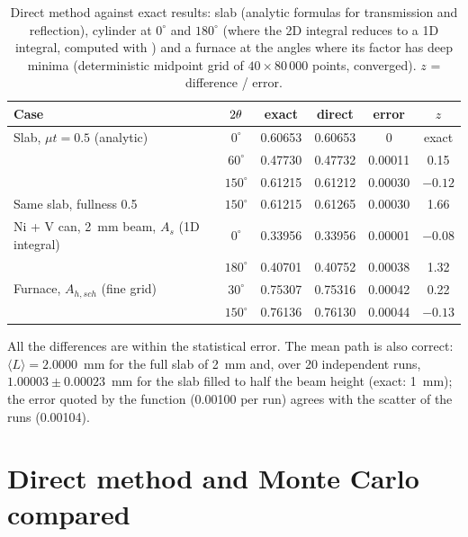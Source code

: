 \begin{table}[H]
  \centering\small
  \begin{tabular}{@{}>{\raggedright\arraybackslash}p{6.2cm}ccccc@{}}
    \toprule \textbf{Case} & $2\theta$ & \textbf{exact} & \textbf{direct} & \textbf{error} & $z$ \\ \midrule
    Slab, $\mu t=0.5$ (analytic) & $0^\circ$   & 0.60653 & 0.60653 & 0       & exact \\
                                                   & $60^\circ$  & 0.47730 & 0.47732 & 0.00011 & 0.15 \\
                                                   & $150^\circ$ & 0.61215 & 0.61212 & 0.00030 & $-0.12$ \\
    Same slab, fullness 0.5                        & $150^\circ$ & 0.61215 & 0.61265 & 0.00030 & 1.66 \\
    Ni + V can, 2~mm beam, $A_s$ (1D integral) & $0^\circ$ & 0.33956 & 0.33956 & 0.00001 & $-0.08$ \\
                                                   & $180^\circ$ & 0.40701 & 0.40752 & 0.00038 & 1.32 \\
    Furnace, $A_{h,sch}$ (fine grid) & $30^\circ$  & 0.75307 & 0.75316 & 0.00042 & 0.22 \\
                                                   & $150^\circ$ & 0.76136 & 0.76130 & 0.00044 & $-0.13$ \\ \bottomrule
  \end{tabular}
  \caption{Direct method against exact results: slab (analytic formulas for transmission and reflection), cylinder at $0^\circ$ and $180^\circ$
  (where the 2D integral reduces to a 1D integral, computed with ) and a furnace at the angles where its factor has deep
  minima (deterministic midpoint grid of $40\times80\,000$ points, converged). $z$ = difference / error.}
  \label{tab:direct-exact}
\end{table}

All the differences are within the statistical error. The mean path is also correct: $\langle L\rangle=2.0000$~mm for the full slab of 2~mm and,
over 20 independent runs, $1.00003\pm0.00023$~mm for the slab filled to half the beam height (exact: 1~mm); the error quoted by the function
(0.00100 per run) agrees with the scatter of the runs (0.00104).

\section{Direct method and Monte Carlo compared}
\label{sec:direct-efficiency}

